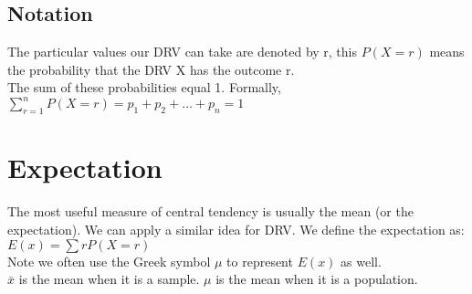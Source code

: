 \documentclass[class=article, crop=false]{standalone}
\begin{document}
\subsection*{Notation}
The particular values our DRV can take are denoted by r, this $P(X = r)$ means the probability that the DRV X has the outcome r. \\
The sum of these probabilities equal 1. Formally, $\sum_{r=1}^n P(X=r) = p_1 + p_2 + \dots + p_n = 1$\\

\section*{Expectation}
The most useful measure of central tendency is usually the mean (or the expectation). We can apply a similar idea for DRV. We define the expectation as: \\
$E(x) = \sum r P(X=r)$ \\
Note we often use the Greek symbol $\mu$ to represent $E(x)$ as well.\\
$\bar{x}$ is the mean when it is a sample.
$\mu$ is the mean when it is a population.
\end{document}

